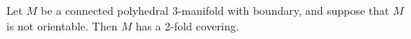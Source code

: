 Let $M$ be a connected polyhedral 3-manifold with boundary, and suppose that $M$ is not orientable. Then $M$ has a 2-fold covering.
